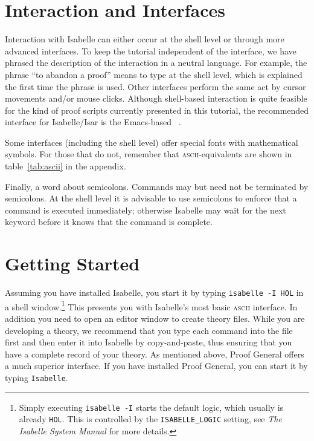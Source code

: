 \section{Interaction and Interfaces}

Interaction with Isabelle can either occur at the shell level or through more
advanced interfaces. To keep the tutorial independent of the interface, we
have phrased the description of the interaction in a neutral language. For
example, the phrase ``to abandon a proof'' means to type  at the
shell level, which is explained the first time the phrase is used. Other
interfaces perform the same act by cursor movements and/or mouse clicks.
Although shell-based interaction is quite feasible for the kind of proof
scripts currently presented in this tutorial, the recommended interface for
Isabelle/Isar is the Emacs-based ~\cite{proofgeneral,Aspinall:TACAS:2000}.

Some interfaces (including the shell level) offer special fonts with
mathematical symbols. For those that do not, remember that \textsc{ascii}-equivalents
are shown in table~\ref{tab:ascii} in the appendix.

Finally, a word about semicolons. 
Commands may but need not be terminated by semicolons.
At the shell level it is advisable to use semicolons to enforce that a command
is executed immediately; otherwise Isabelle may wait for the next keyword
before it knows that the command is complete.


\section{Getting Started}

Assuming you have installed Isabelle, you start it by typing \texttt{isabelle
  -I HOL} in a shell window.\footnote{Simply executing \texttt{isabelle -I}
  starts the default logic, which usually is already \texttt{HOL}.  This is
  controlled by the \texttt{ISABELLE_LOGIC} setting, see \emph{The Isabelle
    System Manual} for more details.} This presents you with Isabelle's most
basic \textsc{ascii} interface.  In addition you need to open an editor window to
create theory files.  While you are developing a theory, we recommend that you
type each command into the file first and then enter it into Isabelle by
copy-and-paste, thus ensuring that you have a complete record of your theory.
As mentioned above, Proof General offers a much superior interface.
If you have installed Proof General, you can start it by typing \texttt{Isabelle}.
